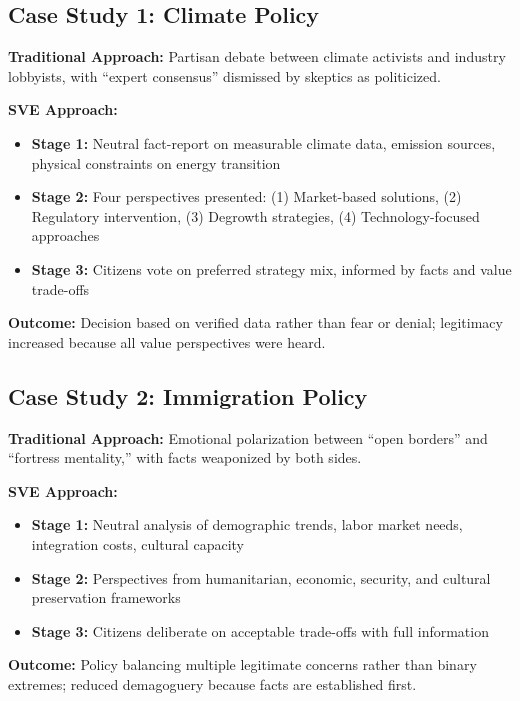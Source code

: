 \documentclass[11pt,a4paper]{article}
\begin{document}
\begin{small}
\subsection*{Case Study 1: Climate Policy}

\textbf{Traditional Approach:} Partisan debate between climate activists and industry lobbyists, with ``expert consensus'' dismissed by skeptics as politicized.

\textbf{SVE Approach:}
\begin{itemize}[nosep]
    \item \textbf{Stage 1:} Neutral fact-report on measurable climate data, emission sources, physical constraints on energy transition
    \item \textbf{Stage 2:} Four perspectives presented: (1) Market-based solutions, (2) Regulatory intervention, (3) Degrowth strategies, (4) Technology-focused approaches
    \item \textbf{Stage 3:} Citizens vote on preferred strategy mix, informed by facts and value trade-offs
\end{itemize}

\textbf{Outcome:} Decision based on verified data rather than fear or denial; legitimacy increased because all value perspectives were heard.

\subsection*{Case Study 2: Immigration Policy}

\textbf{Traditional Approach:} Emotional polarization between ``open borders'' and ``fortress mentality,'' with facts weaponized by both sides.

\textbf{SVE Approach:}
\begin{itemize}[nosep]
    \item \textbf{Stage 1:} Neutral analysis of demographic trends, labor market needs, integration costs, cultural capacity
    \item \textbf{Stage 2:} Perspectives from humanitarian, economic, security, and cultural preservation frameworks
    \item \textbf{Stage 3:} Citizens deliberate on acceptable trade-offs with full information
\end{itemize}

\textbf{Outcome:} Policy balancing multiple legitimate concerns rather than binary extremes; reduced demagoguery because facts are established first.


\end{small}
\end{document}
